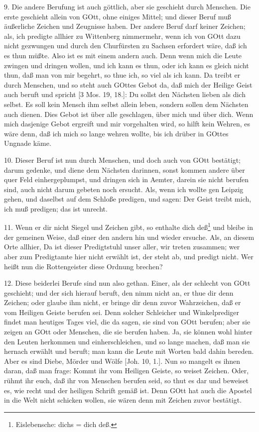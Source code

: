 9. Die andere Berufung ist auch göttlich, aber sie geschieht durch Menschen. Die erste geschieht allein von GOtt, ohne einiges Mittel; und dieser Beruf muß äußerliche Zeichen und Zeugnisse haben. Der andere Beruf darf keiner Zeichen; als, ich predigte allhier zu Wittenberg nimmermehr, wenn ich von GOtt dazu nicht gezwungen und durch den Churfürsten zu Sachsen erfordert wäre, daß ich es thun müßte. Also ist es mit einem andern auch. Denn wenn mich die Leute zwingen und dringen wollen, und ich kann es thun, oder ich kann es gleich nicht thun, daß man von mir begehrt, so thue ich, so viel als ich kann. Da treibt er durch Menschen, und so steht auch GOttes Gebot da, daß mich der Heilige Geist auch beruft und spricht [3 Mos. 19, 18.]: Du sollst den Nächsten lieben als dich selbst. Es soll kein Mensch ihm selbst allein leben, sondern sollen dem Nächsten auch dienen. Dies Gebot ist über alle geschlagen, über mich und über dich. Wenn mich dasjenige Gebot ergreift und mir vorgehalten wird, so hilft kein Wehren, es wäre denn, daß ich mich so lange wehren wollte, bis ich drüber in GOttes Ungnade käme.

10. Dieser Beruf ist nun durch Menschen, und doch auch von GOtt bestätigt; darum gedenke, und diene dem Nächsten darinnen, sonst kommen andere über quer Feld einhergeplumpst, und dringen sich in Aemter, darein sie nicht berufen sind, auch nicht darum gebeten noch ersucht. Als, wenn ich wollte gen Leipzig gehen, und daselbst auf dem Schloße predigen, und sagen: Der Geist treibt mich, ich muß predigen; das ist unrecht.

11. Wenn er dir nicht Siegel und Zeichen gibt, so enthalte dich deß\footnote{Eislebensche: dichs = dich deß.} und bleibe in der gemeinen Weise, daß einer den andern hin und wieder ersuche. Als, an diesem Orte allhier,
Da ist dieser Predigtstuhl unser aller, wir treten zusammen; wer aber zum Predigtamte hier nicht erwählt ist, der steht ab, und predigt nicht. Wer heißt nun die Rottengeister diese Ordnung brechen?

12. Diese beiderlei Berufe sind nun also gethan. Einer, als der schlecht von GOtt geschieht; und der sich hierauf beruft, den nimm nicht an, er thue dir denn Zeichen; oder glaube ihm nicht, er bringe dir denn zuvor Wahrzeichen, daß er vom Heiligen Geiste berufen sei. Denn solcher Schleicher und Winkelprediger findet man heutiges Tages viel, die da sagen, sie sind von GOtt berufen; aber sie zeigen an GOtt oder Menschen, die sie berufen haben. Ja, sie können wohl hinter den Leuten herkommen und einherschleichen, und so lange machen, daß man sie hernach erwählt und beruft; man kann die Leute mit Worten bald dahin bereden. Aber es sind Diebe, Mörder und Wölfe [Joh. 10, 1.]. Nun so mangelt es ihnen daran, daß man frage: Kommt ihr vom Heiligen Geiste, so weiset Zeichen. Oder, rühmt ihr euch, daß ihr von Menschen berufen seid, so thut es dar und beweiset es, wie recht und der heiligen Schrift gemäß ist. Denn GOtt hat auch die Apostel in die Welt nicht schicken wollen, sie wären denn mit Zeichen zuvor bestätigt.

